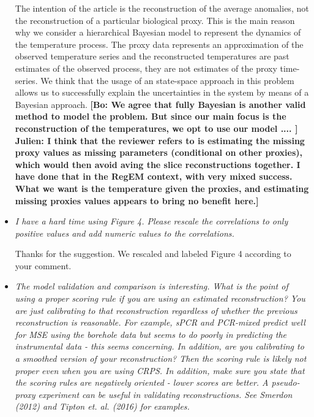 \documentclass[11pt]{article}
\newcommand{\bl}[1]{\color{red}\textbf{[Bo: #1]}\normalcolor}
\newcommand{\jeg}[1]{\color{blue}\textbf{Julien: #1]}\normalcolor}
\begin{document}
\begin{itemize}
The intention of the article is the reconstruction of the average anomalies,
not the reconstruction of a particular biological proxy. This is the main reason
why we consider a hierarchical Bayesian model to represent the dynamics of the temperature
process. The proxy data represents an approximation of the observed temperature
series and the reconstructed temperatures are past estimates of the observed
process, they are not estimates of the proxy time-series. We think that the
usage of an state-space approach in this problem allows us to successfully
explain the uncertainties in the system by means of a Bayesian approach. 
\bl{We agree that fully Bayesian is another valid method to model the problem. But since our main focus is the reconstruction of the temperatures, we opt to use our model ....  }
\jeg{I think that the reviewer refers to is estimating the missing proxy values as missing parameters (conditional on other proxies), which would then avoid aving the slice reconstructions together. I have done that in the RegEM context, with very mixed success. What we want is the temperature given the proxies, and estimating missing proxies values appears to bring no benefit here.}


\item \textit{I have a hard time using Figure 4. Please rescale the correlations
    to only positive values and add numeric values to the correlations.}

  Thanks for the suggestion. We rescaled and labeled Figure 4 according to your comment.

  
\item \textit{The model validation and comparison is interesting. What is the
    point of using a proper scoring rule if you are using an estimated reconstruction? You are just calibrating to that reconstruction regardless of
whether the previous reconstruction is reasonable. For example, sPCR and
PCR-mixed predict well for MSE using the borehole data but seems to do poorly in
predicting the instrumental data - this seems concerning. In addition, are you
calibrating to a smoothed version of your reconstruction? Then the scoring rule
is likely not proper even when you are using CRPS. In addition, make sure you
state that the scoring rules are negatively oriented - lower scores are better.
A pseudo-proxy experiment can be useful in validating reconstructions. See Smerdon (2012) and Tipton et. al. (2016) for examples.
}


\end{itemize}
\end{document}
